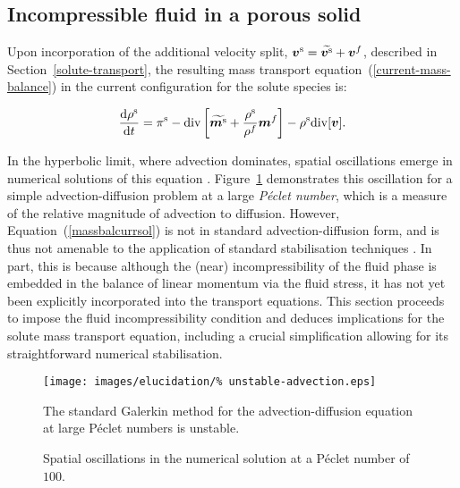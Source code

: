 \subsection{Incompressible fluid in a porous solid}
\label{incompressible-fluid-porous-solid}

Upon incorporation of the additional velocity split,
$\mbox{\boldmath$ v$}^\mathrm{s}=\widetilde{\mbox{\boldmath$ v$}^\mathrm{s}}+\mbox{\boldmath$ v$}^f$, described in
Section~\ref{solute-transport}, the resulting mass transport
equation~(\ref{current-mass-balance}) in the current configuration for
the solute species is:

\begin{equation}
\frac{\mathrm{d}\rho^\mathrm{s}}{\mathrm{d}t} = \pi^\mathrm{s}-
\mathrm{div} \left[\widetilde{\mbox{\boldmath$ m$}^\mathrm{s}}+
  \frac{\rho^\mathrm{s}}{\rho^f}\mbox{\boldmath$ m$}^f\right] - \rho^\mathrm{s}
\mathrm{div}[\mbox{\boldmath$ v$}].
\label{massbalcurrsol}
\end{equation}

\noindent In the hyperbolic limit, where advection dominates, spatial
oscillations emerge in numerical solutions of this equation
\citep{Brooks:82,Paper6}. Figure~\ref{unstable-solution} demonstrates
this oscillation for a simple advection-diffusion problem at a large
{\em P\'eclet number}, which is a measure of the relative magnitude of
advection to diffusion. However, Equation~(\ref{massbalcurrsol}) is
not in standard advection-diffusion form, and is thus not amenable to
the application of standard stabilisation techniques
\citep{Paper6}. In part, this is because although the (near)
incompressibility of the fluid phase is embedded in the balance of
linear momentum via the fluid stress, it has not yet been explicitly
incorporated into the transport equations. This section proceeds to
impose the fluid incompressibility condition and deduces implications
for the solute mass transport equation, including a crucial
simplification allowing for its straightforward numerical
stabilisation.

\begin{figure}
  \begin{center}
  \texttt{[image: images/elucidation/\%
    unstable-advection.eps]}
  \caption{Spatial oscillations in the numerical solution at a
    P\'eclet number of $100$.}
  \label{unstable-solution}
  \end{center}
  {The standard Galerkin method for the advection-diffusion equation
    at large P\'eclet numbers is unstable.}
\end{figure}

